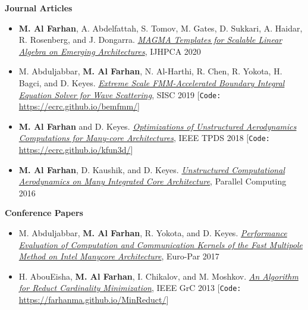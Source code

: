\documentclass[10pt,a4paper]{article}
\begin{document}
\begin{cv}
\begin{cvlist}{}
\vspace{+2mm}
{\bf Journal Articles}
\vspace{-2mm}
\begin{itemize}[label=\raisebox{0.25ex}{\tiny$\bullet$},nosep, leftmargin=*]
\item
\textbf{M. Al Farhan},
A. Abdelfattah, S. Tomov, M. Gates,
D. Sukkari, A. Haidar, R. Rosenberg, and J. Dongarra.
\href{}
{\textit{MAGMA Templates for Scalable Linear Algebra on Emerging
Architectures}}, IJHPCA 2020
\item
M. Abduljabbar,
\textbf{M. Al Farhan},
N. Al-Harthi, R. Chen, R. Yokota, H. Bagci, and D. Keyes.
\href{https://epubs.siam.org/doi/10.1137/18M1173599}
{\textit{Extreme Scale FMM-Accelerated Boundary Integral Equation
Solver for Wave Scattering}}, SISC 2019
[\texttt{Code:} \url{https://ecrc.github.io/bemfmm/}]
\item
\textbf{M. Al Farhan} and D. Keyes.
\href{https://ieeexplore.ieee.org/document/8337750}
{\textit{Optimizations of Unstructured Aerodynamics Computations
for Many-core Architectures}}, IEEE TPDS 2018
[\texttt{Code:} \url{https://ecrc.github.io/kfun3d/}]
\item
\textbf{M. Al Farhan},
D. Kaushik, and D. Keyes.
\href{https://www.sciencedirect.com/science/article/pii/S0167819116300564}
{\textit{Unstructured Computational Aerodynamics on Many
Integrated Core Architecture}}, Parallel Computing 2016
\end{itemize}

\vspace{+2mm}
{\bf Conference Papers}
\vspace{-2mm}
\begin{itemize}[label=\raisebox{0.25ex}{\tiny$\bullet$},nosep, leftmargin=*]
\item
M. Abduljabbar,
\textbf{M. Al Farhan},
R. Yokota, and D. Keyes.
\href{https://link.springer.com/chapter/10.1007/978-3-319-64203-1_40}
{\textit{Performance Evaluation of Computation and Communication
Kernels of the Fast Multipole Method on Intel Manycore Architecture}},
Euro-Par 2017
\item
H. AbouEisha,
\textbf{M. Al Farhan},
I. Chikalov, and M. Moshkov.
\href{https://ieeexplore.ieee.org/document/6740370}
{\textit{An Algorithm for Reduct Cardinality Minimization}},
IEEE GrC 2013
[\texttt{Code:} \url{https://farhanma.github.io/MinReduct/}]
\end{itemize}


\end{cvlist}
\end{cv}
\end{document}

